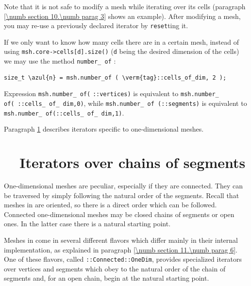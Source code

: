 Note that it is not safe to modify a mesh while iterating over its cells
(paragraph \ref{\numb section 10.\numb parag 3} shows an example).
After modifying a mesh, you may re-use a previously declared iterator by {\small\tt reset}ting it.

If we only want to know how many cells there are in a certain mesh,
instead of using {\small\tt msh.core->cells[d].size()} ({\small\tt d} being the desired
dimension of the cells) we may use the method {\small\tt number\_\,of} :

\begin{Verbatim}[commandchars=\\\{\},formatcom=\small\tt,
   baselinestretch=0.94,framesep=2mm                      ]
   size_t \azul{n} = msh.number_of ( \verm{tag}::cells_of_dim, 2 );
\end{Verbatim}

\noindent Expression {\small\tt msh.number\_\,of}\hskip1pt{\small\tt (}\hskip1pt
{\small\tt {}::vertices}\hskip1pt{\small\tt )} is equivalent to
\hbox{{\small\tt msh.number\_\,of}\hskip1pt{\small\tt (}\hskip1pt
{\small\tt {}::cells\_\,of\_\,dim,}\hskip1pt{\small\tt 0}\hskip1pt{\small\tt )}},
while {\small\tt msh.number\_\,of}\hskip2pt{\small\tt
(}\hskip2pt{\small\tt {}::segments}\hskip2pt{\small\tt )} is equivalent to
{\small\tt msh.number\_\,of}\hskip2pt{\small\tt (}\hskip2pt{\small\tt {}::cells\_\,of\_\,dim,}\hskip2pt{\small\tt 1}\hskip2pt{\small\tt )}.

Paragraph \ref{\numb section 9.\numb parag 4} describes iterators specific to one-dimensional
meshes.


\section{~~Iterators over chains of segments}\label{\numb section 9.\numb parag 4}

One-dimensional meshes are peculiar, especially if they are connected.
They can be traversed by simply following the natural order of the segments.
Recall that meshes in {\maniFEM} are oriented, so there is a direct order which can be followed.
Connected one-dimensional meshes may be closed chains of segments or open ones.
In the latter case there is a natural starting point.

Meshes in {\maniFEM} come in several different flavors which differ mainly in their internal
implementation, as explained in paragraph \ref{\numb section 11.\numb parag 6}.
One of these flavors, called {\small\tt {}::Connected::OneDim}, provides specialized iterators
over vertices and segments which obey to the natural order of the chain of segments and,
for an open chain, begin at the natural starting point.

